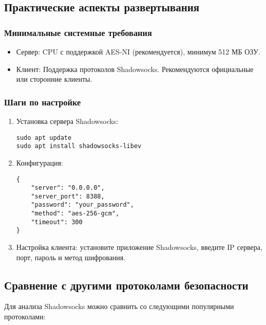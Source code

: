 \documentclass{SCWorks}
\begin{document}
\subsection{Практические аспекты развертывания}

\subsubsection{Минимальные системные требования}
\begin{itemize}
    \item Сервер: CPU с поддержкой AES-NI (рекомендуется), минимум 512 МБ ОЗУ.
    \item Клиент: Поддержка протоколов Shadowsocks. Рекомендуются официальные или сторонние клиенты.
\end{itemize}

\subsubsection{Шаги по настройке}
\begin{enumerate}
    \item Установка сервера Shadowsocks:
    \begin{verbatim}
sudo apt update
sudo apt install shadowsocks-libev
    \end{verbatim}

    \item Конфигурация:
    \begin{verbatim}
{
    "server": "0.0.0.0",
    "server_port": 8388,
    "password": "your_password",
    "method": "aes-256-gcm",
    "timeout": 300
}
    \end{verbatim}

    \item Настройка клиента: установите приложение Shadowsocks, введите IP сервера, порт, пароль и метод шифрования.
\end{enumerate}


\subsection{Сравнение с другими протоколами безопасности}

Для анализа Shadowsocks можно сравнить со следующими популярными протоколами:
\end{document}
